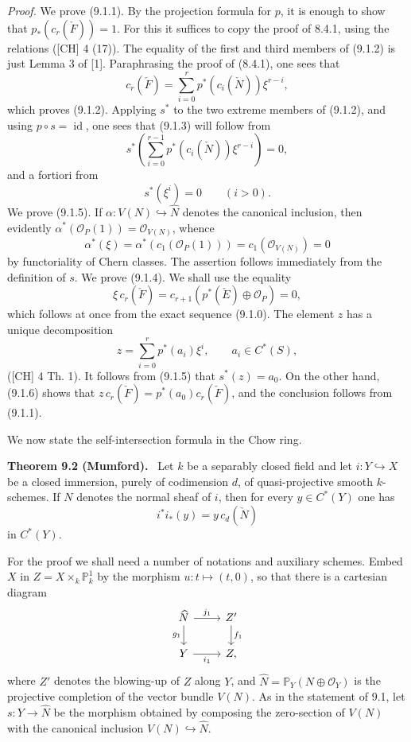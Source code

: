 \documentclass[11pt]{article}
\newenvironment{statement}[1]{\par\medskip\noindent\textbf{#1.}\ }{\par\medskip}
\begin{document}
\emph{Proof.} We prove (9.1.1). By the projection formula for $p$, it is enough to show that $p_*(c_r(\check F))=1$. For this it suffices to copy the proof of 8.4.1, using the relations ([CH] 4 (17)). The equality of the first and third members of (9.1.2) is just Lemma 3 of [1]. Paraphrasing the proof of (8.4.1), one sees that
\[
c_r(\check F)=\sum_{i=0}^r p^*(c_i(\check N))\xi^{r-i},
\tag{9.1.2 bis}
\]
which proves (9.1.2). Applying $s^*$ to the two extreme members of (9.1.2), and using $p\circ s=\operatorname{id}$, one sees that (9.1.3) will follow from
\[
s^*\left(\sum_{i=0}^{r-1}p^*(c_i(\check N))\xi^{r-i}\right)=0,
\]
and a fortiori from
\[
s^*(\xi^i)=0\qquad(i>0).
\tag{9.1.5}
\]
We prove (9.1.5). If $\alpha:V(N)\hookrightarrow\widehat N$ denotes the canonical inclusion, then evidently $\alpha^*(\mathcal O_P(1))=\mathcal O_{V(N)}$, whence
\[
\alpha^*(\xi)=\alpha^*(c_1(\mathcal O_P(1)))=c_1(\mathcal O_{V(N)})=0
\]
by functoriality of Chern classes. The assertion follows immediately from the definition of $s$. We prove (9.1.4). We shall use the equality
\[
\xi\,c_r(\check F)=c_{r+1}(p^*(\check E)\oplus\mathcal O_P)=0,
\tag{9.1.6}
\]
which follows at once from the exact sequence (9.1.0). The element $z$ has a unique decomposition
\[
z=\sum_{i=0}^r p^*(a_i)\xi^i,\qquad a_i\in C^*(S),
\]
([CH] 4 Th. 1). It follows from (9.1.5) that $s^*(z)=a_0$. On the other hand, (9.1.6) shows that $z\,c_r(\check F)=p^*(a_0)c_r(\check F)$, and the conclusion follows from (9.1.1).

We now state the self-intersection formula in the Chow ring.

\begin{statement}{Theorem 9.2 (Mumford)}
Let $k$ be a separably closed field and let $i:Y\hookrightarrow X$ be a closed immersion, purely of codimension $d$, of quasi-projective smooth $k$-schemes. If $N$ denotes the normal sheaf of $i$, then for every $y\in C^*(Y)$ one has
\[
i^*i_*(y)=y\,c_d(\check N)
\]
in $C^*(Y)$.
\end{statement}

For the proof we shall need a number of notations and auxiliary schemes. Embed $X$ in $Z=X\times_k\mathbb P^1_k$ by the morphism $u:t\mapsto(t,0)$, so that there is a cartesian diagram
\[
\begin{tikzcd}
\widehat N \arrow[r,"j_1"] \arrow[d,"g_1"'] & Z' \arrow[d,"f_1"]\\
Y \arrow[r,"i_1"'] & Z ,
\end{tikzcd}
\]
where $Z'$ denotes the blowing-up of $Z$ along $Y$, and $\widehat N=\mathbb P_Y(N\oplus\mathcal O_Y)$ is the projective completion of the vector bundle $V(N)$. As in the statement of 9.1, let $s:Y\to\widehat N$ be the morphism obtained by composing the zero-section of $V(N)$ with the canonical inclusion $V(N)\hookrightarrow\widehat N$.
\end{document}
